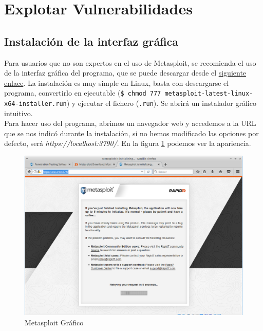 \documentclass[a4,12pt,onecolum]{article}
\begin{document}

\clearpage
\section{Explotar Vulnerabilidades}


\subsection{Instalación de la interfaz gráfica}
Para usuarios que no son expertos en el uso de Metasploit, se recomienda el uso de la interfaz gráfica del programa, que se puede descargar desde el \href{https://www.rapid7.com/products/metasploit/download/}{siguiente enlace}. La instalación es muy simple en Linux, basta con descargarse el programa, convertirlo en ejecutable (\texttt{\$ chmod 777 metasploit-latest-linux-x64-installer.run}) y ejecutar el fichero (\texttt{.run}). Se abrirá un instalador gráfico intuitivo. \\

Para hacer uso del programa, abrimos un navegador web y accedemos a la URL que se nos indicó durante la instalación, si no hemos modificado las opciones por defecto, será \emph{https://localhost:3790/}. En la figura \ref{fig:graf1} podemos ver la apariencia.

\begin{figure}[htbp]
\centering
\includegraphics[width=1.0\textwidth]{./images/interfaz_metasploit/metasploit_grafico.png}
\caption{Metasploit Gráfico}
\label{fig:graf1}
\end{figure}
\end{document}
